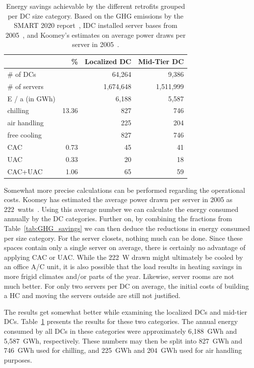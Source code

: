 \documentclass[officiallayout]{tktla}
\begin{document}

\begin{table}
  \centering
  \begin{tabular}{l|r|r|r} \hline
 & \% & Localized DC & Mid-Tier DC \\
 \hline
\# of DCs &  & 64,264 & 9,386 \\
\# of servers &  & 1,674,648 & 1,511,999 \\
E / a (in GWh) &  & 6,188 & 5,587 \\
chilling & 13.36 & 827 & 746 \\
air handling & & 225 & 204 \\
free cooling & & 827 & 746 \\
CAC & 0.73 & 45 & 41 \\
UAC & 0.33 & 20 & 18 \\
CAC+UAC & 1.06 & 65 & 59 \\
\hline
  \end{tabular}
  \caption{Energy savings achievable by the different retrofits grouped per DC
  size category. Based on the 
  GHG emissions by the SMART 2020 report~\cite{Webb2008}, IDC installed server
  bases from 2005~\cite{Bailey2006}, and Koomey's estimates on average power
  draws per server in 2005~\cite{Koomey2008}.}
  \label{tab:E_savings}
\end{table}

Somewhat more precise calculations can be performed regarding the operational
costs. Koomey has estimated the average power drawn per server in 2005 as
222~watts~\cite{Koomey2008}. Using this average number we can calculate the
energy consumed annually by the DC categories. Further on, by combining the
fractions from Table~\ref{tab:GHG_savings} we can then deduce the reductions
in energy consumed per size category. For the server closets, nothing much can
be done.  Since these spaces contain only a single server on average, there is
certainly no advantage of applying CAC or UAC. While the 222~W drawn might
ultimately be cooled by an office A/C unit, it is also possible that the load
results in heating savings in more frigid climates and/or parts of the year.
Likewise, server rooms are not much better. For only two servers per DC on
average, the initial costs of building a HC and moving the servers outside are
still not justified.

The results get somewhat better while examining the localized DCs and mid-tier
DCs. Table~\ref{tab:E_savings} presents the results for these two categories.
The annual energy consumed by all DCs in these categories were approximately
6,188~GWh and 5,587~GWh, respectively. These numbers may then be split into
827~GWh and 746~GWh used for chilling, and 225~GWh and 204~GWh used for air
handling purposes.
\end{document}
